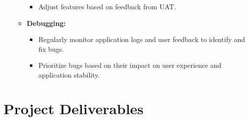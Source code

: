 \documentclass[a4paper]{article}
\begin{document}
\begin{enumerate}
\begin{itemize}
\begin{itemize}
            \item Adjust features based on feedback from UAT.
        \end{itemize}
        \item \textbf{Debugging:}
        \begin{itemize}
            \item Regularly monitor application logs and user feedback to identify and fix bugs.
            \item Prioritize bugs based on their impact on user experience and application stability.
        \end{itemize}
    \end{itemize}
\end{enumerate}

\section{Project Deliverables}
\end{document}
